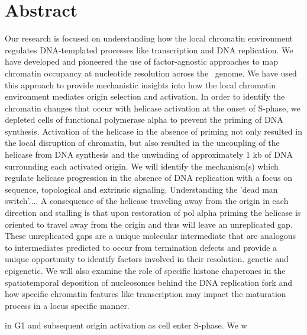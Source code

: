 
\section*{Abstract}
Our research is focused on understanding how the local chromatin environment regulates DNA-templated processes like transcription and DNA replication.  We have developed and pioneered the use of factor-agnostic approaches to map chromatin occupancy at nucleotide resolution across the \scer\ genome.  We have used this approach to provide mechanistic insights into how the local chromatin environment mediates origin selection and activation. In order to identify the chromatin changes that occur with helicase activation at the onset of S-phase, we depleted cells of functional polymerase alpha to prevent the priming of DNA synthesis.  Activation of the helicase in the absence of priming not only resulted in the local disruption of chromatin, but also resulted in the uncoupling of the helicase from DNA synthesis and the unwinding of approximately 1 kb of DNA surrounding each activated origin.   We will identify the mechanism(s) which regulate helicase progression in the absence of DNA replication with a focus on sequence, topological and extrinsic signaling.  Understanding the 'dead man switch'....   A consequence of the helicase traveling away from the origin in each direction and stalling is that upon restoration of pol alpha priming the helicase is oriented to travel away from the origin and thus will leave an unreplicated gap.  These unreplicated gaps are a unique molecular intermediate that are analogous to intermediates predicted to occur from termination defects and provide a unique opportunity to identify factors involved in their resolution.  genetic and epigenetic.  We will also examine the role of specific histone chaperones in the spatiotemporal deposition of nucleosomes behind the DNA replication fork and how specific chromatin features like transcription may impact the maturation process in a locus specific manner.   



in G1 and subsequent origin activation as cell enter S-phase.  We w

